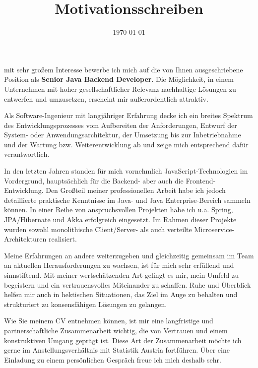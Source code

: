 \documentclass[12pt,a4paper,sans]{moderncv}
\title{Motivationsschreiben}
\date{\today}
\begin{document}
\setcounter{page}{0}
\makelettertitle

mit sehr großem Interesse bewerbe ich mich auf die von Ihnen ausgeschriebene
Position als \textbf{Senior Java Backend Developer}. Die Möglichkeit, in einem
Unternehmen mit hoher gesellschaftlicher Relevanz nachhaltige Lösungen zu
entwerfen und umzusetzen, erscheint mir außerordentlich attraktiv.

Als Software-Ingenieur mit langjähriger Erfahrung decke ich ein breites
Spektrum des Entwicklungsprozesses vom Aufbereiten der Anforderungen,
Entwurf der System- oder Anwendungsarchitektur, der Umsetzung bis zur
Inbetriebnahme und der Wartung bzw. Weiterentwicklung ab und zeige mich
entsprechend dafür verantwortlich.

In den letzten Jahren standen für mich vornehmlich JavaScript-Technologien
im Vordergrund, hauptsächlich für die Backend- aber auch die
Frontend-Entwicklung. Den Großteil meiner professionellen Arbeit habe ich
jedoch detaillierte praktische Kenntnisse im Java- und Java Enterprise-Bereich
sammeln können. In einer Reihe von anspruchsvollen Projekten habe ich
u.a. Spring, JPA/Hibernate und Akka erfolgreich eingesetzt. Im Rahmen dieser
Projekte wurden sowohl monolithische Client/Server- als auch verteilte
Microservice-\allowbreak Architekturen realisiert.

Meine Erfahrungen an andere weiterzugeben und gleichzeitig gemeinsam im Team
an aktuellen Herausforderungen zu wachsen, ist für mich sehr erfüllend und
sinnstiftend. Mit meiner wertschätzenden Art gelingt es mir, mein Umfeld
zu begeistern und ein vertrauensvolles Miteinander zu schaffen.
Ruhe und Überblick helfen mir auch in hektischen Situationen, das Ziel im Auge
zu behalten und strukturiert zu konsensfähigen Lösungen zu gelangen.

Wie Sie meinem CV entnehmen können, ist mir eine langfristige und
partnerschaftliche Zusammenarbeit wichtig, die von Vertrauen und einem
konstruktiven Umgang geprägt ist. Diese Art der Zusammenarbeit möchte
ich gerne im Anstellungsverhältnis mit Statistik Austria fortführen.
Über eine Einladung zu einem persönlichen Gespräch freue ich
mich deshalb sehr.

\makeletterclosing
\end{document}
